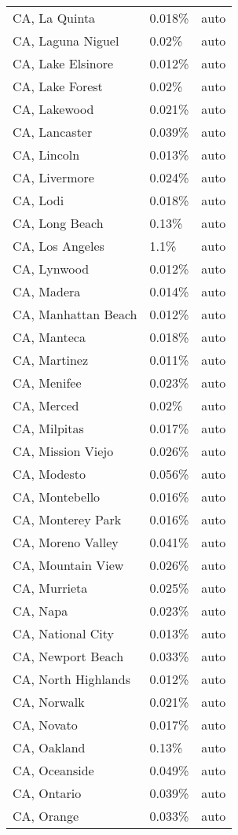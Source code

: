\begin{longtable}[]{@{}lll@{}}
CA, La Quinta & 0.018\% & auto \\
CA, Laguna Niguel & 0.02\% & auto \\
CA, Lake Elsinore & 0.012\% & auto \\
CA, Lake Forest & 0.02\% & auto \\
CA, Lakewood & 0.021\% & auto \\
CA, Lancaster & 0.039\% & auto \\
CA, Lincoln & 0.013\% & auto \\
CA, Livermore & 0.024\% & auto \\
CA, Lodi & 0.018\% & auto \\
CA, Long Beach & 0.13\% & auto \\
CA, Los Angeles & 1.1\% & auto \\
CA, Lynwood & 0.012\% & auto \\
CA, Madera & 0.014\% & auto \\
CA, Manhattan Beach & 0.012\% & auto \\
CA, Manteca & 0.018\% & auto \\
CA, Martinez & 0.011\% & auto \\
CA, Menifee & 0.023\% & auto \\
CA, Merced & 0.02\% & auto \\
CA, Milpitas & 0.017\% & auto \\
CA, Mission Viejo & 0.026\% & auto \\
CA, Modesto & 0.056\% & auto \\
CA, Montebello & 0.016\% & auto \\
CA, Monterey Park & 0.016\% & auto \\
CA, Moreno Valley & 0.041\% & auto \\
CA, Mountain View & 0.026\% & auto \\
CA, Murrieta & 0.025\% & auto \\
CA, Napa & 0.023\% & auto \\
CA, National City & 0.013\% & auto \\
CA, Newport Beach & 0.033\% & auto \\
CA, North Highlands & 0.012\% & auto \\
CA, Norwalk & 0.021\% & auto \\
CA, Novato & 0.017\% & auto \\
CA, Oakland & 0.13\% & auto \\
CA, Oceanside & 0.049\% & auto \\
CA, Ontario & 0.039\% & auto \\
CA, Orange & 0.033\% & auto \\

\end{longtable}
